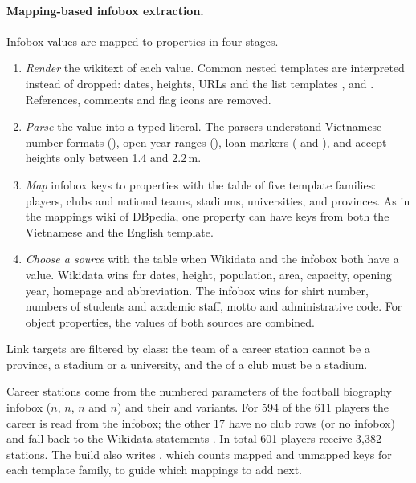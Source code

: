 \paragraph{Mapping-based infobox extraction.} Infobox values are mapped to
 properties in four stages.
\begin{enumerate}
  \item \emph{Render} the wikitext of each value. Common nested templates are
        interpreted instead of dropped: dates, heights, URLs and the list
        templates ,  and . References,
        comments and flag icons are removed.
  \item \emph{Parse} the value into a typed literal. The parsers understand
        Vietnamese number formats (), open year ranges
        (), loan markers ( and ), and accept
        heights only between 1.4 and 2.2\,m.
  \item \emph{Map} infobox keys to  properties with the
         table of five template families: players, clubs and
        national teams, stadiums, universities, and provinces. As in the
        mappings wiki of DBpedia, one property can have keys from both the
        Vietnamese and the English template.
  \item \emph{Choose a source} with the  table when Wikidata
        and the infobox both have a value. Wikidata wins for dates, height,
        population, area, capacity, opening year, homepage and abbreviation.
        The infobox wins for shirt number, numbers of students and academic
        staff, motto and administrative code. For object
        properties, the values of both sources are combined.
\end{enumerate}
Link targets are filtered by class: the team of a career station cannot be a
province, a stadium or a university, and the  of a club must
be a stadium.

Career stations come from the numbered parameters of the football biography
infobox ($n$, $n$, $n$ and $n$)
and their  and  variants. For 594 of the 611 players
the career is read from the infobox; the other 17 have no club rows (or no
infobox) and fall back to the Wikidata statements . In total 601
players receive 3{,}382 stations. The
build also writes , which counts mapped
and unmapped keys for each template family, to guide which mappings to add next.

